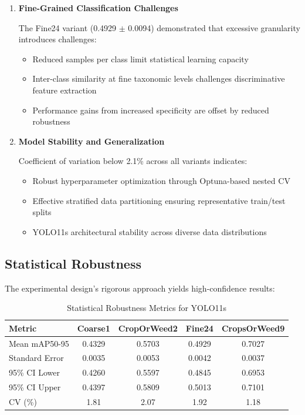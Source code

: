 \begin{enumerate}
    \item \textbf{Fine-Grained Classification Challenges}
    
    The Fine24 variant (0.4929 $\pm$ 0.0094) demonstrated that excessive granularity introduces challenges:
    \begin{itemize}
        \item Reduced samples per class limit statistical learning capacity
        \item Inter-class similarity at fine taxonomic levels challenges discriminative feature extraction
        \item Performance gains from increased specificity are offset by reduced robustness
    \end{itemize}
    
    \item \textbf{Model Stability and Generalization}
    
    Coefficient of variation below 2.1\% across all variants indicates:
    \begin{itemize}
        \item Robust hyperparameter optimization through Optuna-based nested CV
        \item Effective stratified data partitioning ensuring representative train/test splits
        \item YOLO11s architectural stability across diverse data distributions
    \end{itemize}
\end{enumerate}

\subsection{Statistical Robustness}

The experimental design's rigorous approach yields high-confidence results:

\begin{table}[htbp]
\centering
\caption{Statistical Robustness Metrics for YOLO11s}
\label{tab:yolo11s_robustness}
\begin{tabular}{lcccc}
\toprule
\textbf{Metric} & \textbf{Coarse1} & \textbf{CropOrWeed2} & \textbf{Fine24} & \textbf{CropsOrWeed9} \\
\midrule
Mean mAP50-95    & 0.4329 & 0.5703 & 0.4929 & 0.7027 \\
Standard Error   & 0.0035 & 0.0053 & 0.0042 & 0.0037 \\
95\% CI Lower    & 0.4260 & 0.5597 & 0.4845 & 0.6953 \\
95\% CI Upper    & 0.4397 & 0.5809 & 0.5013 & 0.7101 \\
CV (\%)          & 1.81   & 2.07   & 1.92   & 1.18   \\
\bottomrule
\end{tabular}
\end{table}

